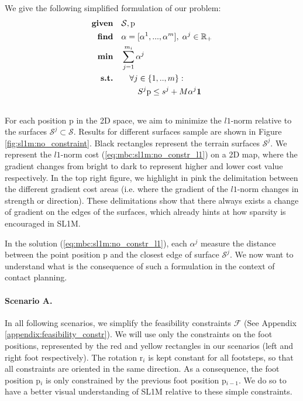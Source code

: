 We give the following simplified formulation of our problem:
\begin{align}
    \textrm{\textbf{given}} \quad & \mathcal{S}, \mbox{p} \nonumber\\
    \textrm{\textbf{find}}  \quad & \alpha=[\alpha^1,...,\alpha^m],\; \alpha^j \in \mathbb{R}_{+} \nonumber\\
    \textrm{\textbf{min}}  \quad & \sum_{j=1}^{m_i} \alpha^j \label{eq:mbc:sl1m:no_constr_l1}\\
    \textrm{\textbf{s.t.}}  \quad & \quad \forall j \in \{1,..,m\} : \nonumber\\
                            \quad & \quad \quad S^j \mbox{p} \leq s^j + M \alpha^j \textbf{1} \nonumber\\
                            \nonumber
\end{align}
For each position p in the 2D space, we aim to minimize the $l1$-norm relative to the surfaces $\mathcal{S}^j \subset \mathcal{S}$. 
Results for different surfaces sample are shown in Figure \ref{fig:sl1m:no_constraint}.
Black rectangles represent the terrain surfaces $\mathcal{S}^j$.
We represent the $l1$-norm cost (\ref{eq:mbc:sl1m:no_constr_l1}) on a 2D map, where the gradient changes from bright to dark to represent higher and lower cost value respectively.
In the top right figure, we highlight in pink the delimitation between the different gradient cost areas (i.e. where the gradient of the $l1$-norm changes in strength or direction).
These delimitations show that there always exists a change of gradient on the edges of the surfaces, which already hints at how sparsity is encouraged in SL1M.

In the solution (\ref{eq:mbc:sl1m:no_constr_l1}), each $\alpha^j$ measure the distance between the point position p and the closest edge of surface $\mathcal{S}^j$.
We now want to understand what is the consequence of such a formulation in the context of contact planning.


\paragraph{Scenario A.}

In all following scenarios, we simplify the feasibility constraints $\mathcal{F}$ (See Appendix \ref{appendix:feasibility_constr}).
We will use only the constraints on the foot positions, represented by the red and yellow rectangles in our scenarios (left and right foot respectively).
The rotation r$_i$ is kept constant for all footsteps, so that all constraints are oriented in the same direction.
As a consequence, the foot position p$_i$ is only constrained by the previous foot position p$_{i-1}$.
We do so to have a better visual understanding of SL1M relative to these simple constraints.

